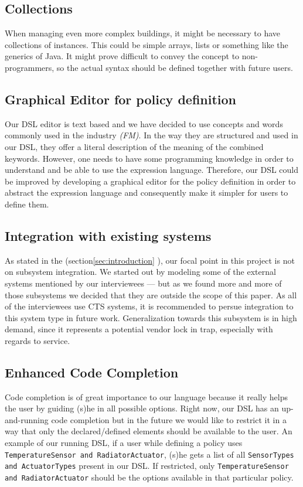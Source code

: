 \subsection{Collections}\label{subsec:collections}
When managing even more complex buildings, it might be necessary to have collections of instances. This could be simple arrays, lists or something like the generics of Java. It might prove difficult to convey the concept to non-programmers, so the actual syntax should be defined together with future users.

\subsection{Graphical Editor for policy definition}\label{subsec:graphicaleditor}
Our DSL editor is text based and we have decided to use concepts and words commonly used in the industry \textit{(FM)}. In the way they are structured and used in our DSL, they offer a literal description of the meaning of the combined keywords. However, one needs to have some programming knowledge in order to understand and be able to use the expression language. Therefore, our DSL could be improved by developing a graphical editor for the policy definition in order to abstract the expression language and consequently make it simpler for users to define them.

\subsection{Integration with existing systems}\label{subsec:integration}
As stated in the (section\ref{sec:introduction} ), our focal point in this project is not on subsystem integration. We started out by modeling some of the external systems mentioned by our interviewees --- but as we found more and more of those subsystems we decided that they are outside the scope of this paper. As all of the interviewees use CTS systems, it is recommended to persue integration to this system type in future work. Generalization towards this subsystem is in high demand, since it represents a potential vendor lock in trap, especially with regards to service.

\subsection{Enhanced Code Completion}\label{subsec:codecompletion}
Code completion is of great importance to our language because it really helps the user by guiding (s)he in all possible options. Right now, our DSL has an up-and-running code completion but in the future we would like to restrict it in a way that only the declared/defined elements should be available to the user. An example of our running DSL, if a user while defining a policy uses \texttt{TemperatureSensor and RadiatorActuator}, (s)he gets a list of all \texttt{SensorTypes and ActuatorTypes} present in our DSL. If restricted, only \texttt{TemperatureSensor and RadiatorActuator} should be the options available in that particular policy.

